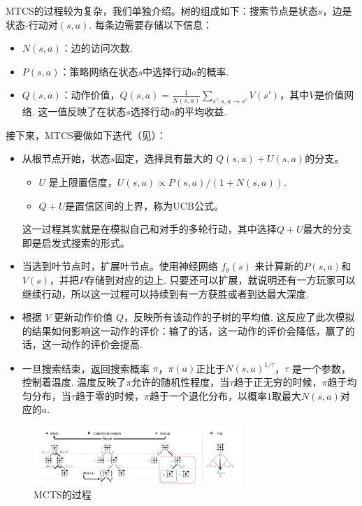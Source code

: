 MTCS的过程较为复杂，我们单独介绍。树的组成如下：搜索节点是状态$s$，边是状态-行动对$(s,a)$. 每条边需要存储以下信息：
\begin{itemize}
    \item $N(s,a)$：边的访问次数.
    \item $P(s,a)$：策略网络在状态$s$中选择行动$a$的概率.
    \item $Q(s,a)$：动作价值，$Q(s,a)=\frac{1}{N(s,a)}\sum_{s':s,a\to s'} V(s')$，其中$V$是价值网络. 这一值反映了在状态$s$选择行动$a$的平均收益.
\end{itemize}

接下来，MTCS要做如下迭代（见）：
\begin{itemize}
  \item 从根节点开始，状态$s$固定，选择具有最大的 $Q(s,a) + U(s,a)$的分支。
  \begin{itemize}
    \item $U$ 是上限置信度，$U(s,a)\propto{P(s,a)}/(1+N(s,a))$.
    \item $Q+U$是置信区间的上界，称为UCB公式。
  \end{itemize}
  这一过程其实就是在模拟自己和对手的多轮行动，其中选择$Q+U$最大的分支即是启发式搜索的形式。

  \item 当选到叶节点时，扩展叶节点。使用神经网络 $f_\theta(s)$ 来计算新的$P(s,a)$和$V(s)$，并把$P$存储到对应的边上. 只要还可以扩展，就说明还有一方玩家可以继续行动，所以这一过程可以持续到有一方获胜或者到达最大深度.

  \item 根据 $V$ 更新动作价值 $Q$，反映所有该动作的子树的平均值. 这反应了此次模拟的结果如何影响这一动作的评价：输了的话，这一动作的评价会降低，赢了的话，这一动作的评价会提高.

  \item 一旦搜索结束，返回搜索概率 $\pi$，$\pi(a)$正比于$N(s,a)^{1/\tau}$，$\tau$ 是一个参数，控制着温度. 温度反映了$\pi$允许的随机性程度，当$\tau$趋于正无穷的时候，$\pi$趋于均匀分布，当$\tau$趋于零的时候，$\pi$趋于一个退化分布，以概率$1$取最大$N(s,a)$对应的$a$.
\end{itemize}

\begin{figure}[ht]
\centering
\includegraphics[width=0.7\textwidth]{Figures/game/mcts.png}
    \caption{MCTS的过程}
    \label{fig:mcts}
\end{figure}

